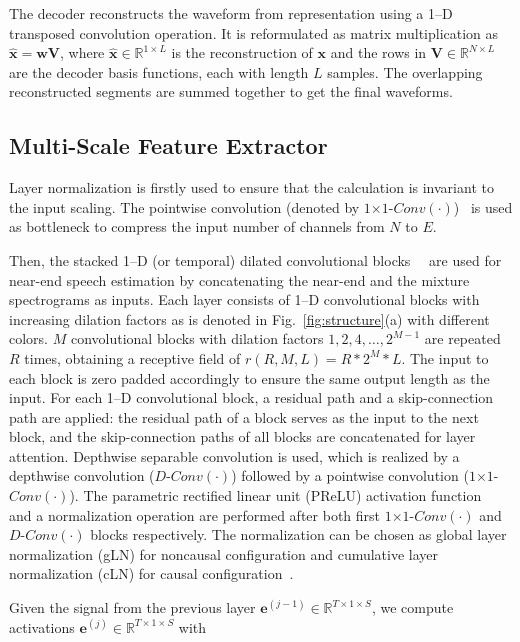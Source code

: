 \documentclass{article}
\begin{document}
\begin{sloppy}
The decoder reconstructs the waveform from representation using a 1--D transposed convolution operation. It is reformulated as matrix multiplication as $\hat{\mathbf{x}}=\mathbf{w} \mathbf{V}$, where $\hat{\mathbf{x}} \in \mathbb{R}^{1 \times L}$ is the reconstruction of $\mathbf{x}$ and the rows in $\mathbf{V} \in \mathbb{R}^{N \times L}$ are the decoder basis functions, each with length $L$ samples. The overlapping reconstructed segments are summed together
to get the final waveforms.

\subsection{Multi-Scale Feature Extractor}
\label{sec:masking}
Layer normalization is firstly used to ensure that the calculation is invariant to the input scaling. The pointwise convolution (denoted by $1$$\times $$1$-$Conv(\cdot)$)~\cite{ref_depthwise} is used as bottleneck to compress the input number of channels from $N$ to $E$.

Then, the stacked 1--D (or temporal) dilated convolutional blocks~\cite{ref_tcn}~\cite{ref_convtasnet} are used for near-end speech estimation by concatenating the near-end and the mixture spectrograms as inputs. Each layer consists of 1--D convolutional blocks with increasing dilation factors as is denoted in Fig.~\ref{fig:structure}(a) with different colors. $M$ convolutional blocks with dilation factors $1,2,4, \ldots, 2^{M-1}$ are repeated $R$ times, obtaining a receptive field of $r(R,M,L) = R * 2^M * L$. The input to each block is zero padded accordingly to ensure the same output length as the input. For each 1--D convolutional block, a residual path and a skip-connection path are applied: the residual path of a block serves as the input to the next block, and the skip-connection paths of all blocks are concatenated for layer attention. Depthwise separable convolution is used, which is realized by a depthwise convolution ($D$-$Conv(\cdot)$) followed by a pointwise convolution ($1$$\times $$1$-$Conv(\cdot)$). The parametric rectified linear unit (PReLU) activation function~\cite{ref_prelu} and a normalization operation are performed after both first $1$$\times $$1$-$Conv(\cdot)$ and $D$-$Conv(\cdot)$ blocks respectively. The normalization can be chosen as global layer normalization (gLN) for noncausal configuration and cumulative layer normalization (cLN) for causal configuration~\cite{ref_convtasnet}\cite{ref_layernorm}.

Given the signal from the previous layer $\mathbf{e}^{(j-1)}  \in \mathbb{R}^{{T} \times 1 \times S}$, we compute activations $\mathbf{e}^{(j)}  \in \mathbb{R}^{{T} \times 1 \times S}$ with


\end{sloppy}
\end{document}
